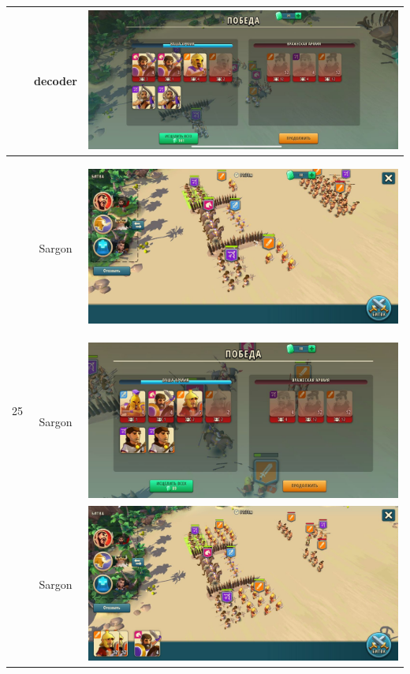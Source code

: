 \begin{longtable}{|c|c|c|}
    & decoder &
    \includegraphics[width=0.75\linewidth]{./parts/media/TreasureHunt/25/decoder/photo_2022-04-06_18-10-34.jpg} \\
    \hline
    \multirow{10}{*}{25} & Sargon &
    \hypertarget{fight25}{\includegraphics[width=0.75\linewidth]{./parts/media/TreasureHunt/25/sargon/photo_2022-04-07_09-58-31.jpg}} \\
    & Sargon &
    \includegraphics[width=0.75\linewidth]{./parts/media/TreasureHunt/25/sargon/photo_2022-04-07_09-58-35.jpg} \\
    & Sargon &
    \includegraphics[width=0.75\linewidth]{./parts/media/TreasureHunt/25/sargon/photo_2022-04-07_09-58-16.jpg} \\

\end{longtable}
